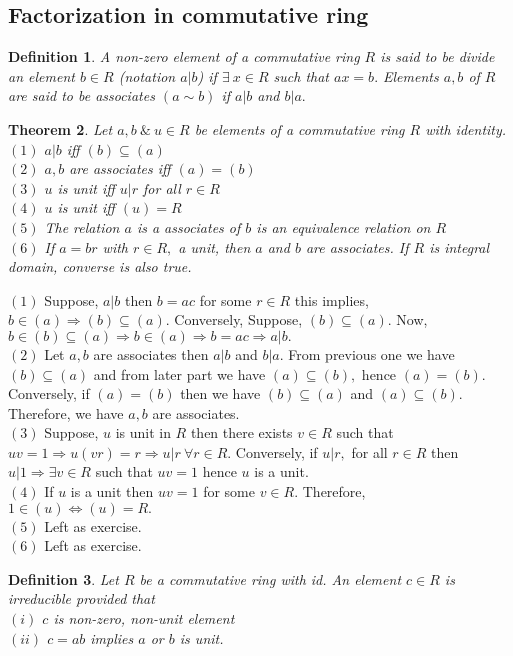 \documentclass[11pt]{amsart}
\newtheorem{theorem}{Theorem}[section]
\newtheorem{definition}[theorem]{Definition}%
\begin{document}
\subsection*{Factorization in commutative ring}
\begin{definition}
A non-zero element of a commutative ring $R$ is said to be divide an element $b\in R$ (notation $a|b$) if $\exists~ x\in R$ such that $ax=b.$ Elements $a,b$ of $R$ are said to be associates $(a\sim b)$ if $a|b$ and $b|a.$
\end{definition}
\begin{theorem}
Let $a,b ~\& ~u\in R$ be elements of a commutative ring $R$ with identity.\\
$(1)$ $a|b$ iff $(b)\subseteq (a)$\\
$(2)$ $a,b$ are associates iff $(a)=(b)$\\
$(3)$ $u$ is unit iff $u|r$ for all $r\in R$\\
$(4)$ $u$ is unit iff $(u)=R$\\
$(5)$ The relation $a$ is a associates of $b$ is an equivalence relation on $R$\\
$(6)$ If $a=br$ with $r\in R,$ a unit, then $a$ and $b$ are associates. If $R$ is integral domain, converse is also true.
\end{theorem}
\proof $(1)$ Suppose, $a|b$ then $b=ac$ for some $r\in R$ this implies, $b\in (a) \Rightarrow (b)\subseteq (a).$ Conversely, Suppose, $(b)\subseteq (a).$ Now,$b \in (b)\subseteq (a) \Rightarrow b\in (a) \Rightarrow b=ac \Rightarrow a|b.$ \\
$(2)$ Let $a,b$ are associates then $a|b$ and $b|a.$ From previous one we have $(b)\subseteq (a)$ and from later part we have $(a)\subseteq (b),$ hence $(a)=(b).$ Conversely, if $(a)=(b)$ then we have $(b)\subseteq (a)$ and $(a)\subseteq (b).$ Therefore, we have $a,b$ are associates.\\
$(3)$ Suppose, $u$ is unit in $R$ then there exists $v\in R$ such that $uv=1 \Rightarrow u(vr)=r \Rightarrow u|r ~\forall r\in R.$ Conversely, if $u|r,$ for all $r\in R$ then $u|1 \Rightarrow \exists v\in R$ such that $uv=1$ hence $u$ is a unit.\\
$(4)$ If $u$ is a unit then $uv=1$ for some $v\in R.$ Therefore, $1\in (u) \Leftrightarrow (u)=R.$\\
$(5)$ Left as exercise.\\ 
$(6)$ Left as exercise.
\begin{definition}
Let $R$ be a commutative ring with id. An element $c\in R$ is irreducible provided that \\
$(i)$ $c$ is non-zero, non-unit element\\
$(ii)$ $c=ab$ implies $a$ or $b$ is unit.
\end{definition}
\end{document}
